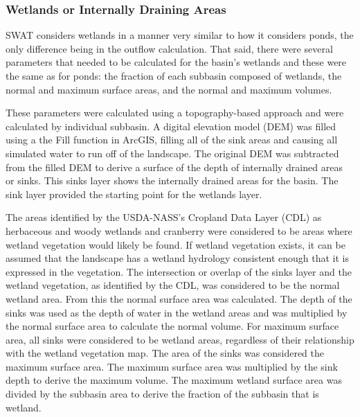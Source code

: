 \subsubsection{Wetlands or Internally Draining Areas}\label{sec:wetlands}

	SWAT considers wetlands in a manner very similar to how it considers ponds, the only difference being in the outflow calculation. That said, there were several parameters that needed to be calculated for the basin's wetlands and these were the same as for ponds: the fraction of each subbasin composed of wetlands, the normal and maximum surface areas, and the normal and maximum volumes. 
	
	These parameters were calculated using a topography-based approach and were calculated by individual subbasin. A digital elevation model (DEM) was filled using a the Fill function in ArcGIS, filling all of the sink areas and causing all simulated water to run off of the landscape. The original DEM was subtracted from the filled DEM to derive a surface of the depth of internally drained areas or sinks.  This sinks layer shows the internally drained areas for the basin. The sink layer provided the starting point for the wetlands layer. 
	
	The areas identified by the USDA-NASS's Cropland Data Layer (CDL) as herbaceous and woody wetlands and cranberry were considered to be areas where wetland vegetation would likely be found. If wetland vegetation exists, it can be assumed that the landscape has a wetland hydrology consistent enough that it is expressed in the vegetation. The intersection or overlap of the sinks layer and the wetland vegetation, as identified by the CDL, was considered to be the normal wetland area. From this the normal surface area was calculated. The depth of the sinks was used as the depth of water in the wetland areas and was multiplied by the normal surface area to calculate the normal volume. For maximum surface area, all sinks were considered to be wetland areas, regardless of their relationship with the wetland vegetation map. The area of the sinks was considered the maximum surface area. The maximum surface area was multiplied by the sink depth to derive the maximum volume. The maximum wetland surface area was divided by the subbasin area to derive the fraction of the subbasin that is wetland.
	

